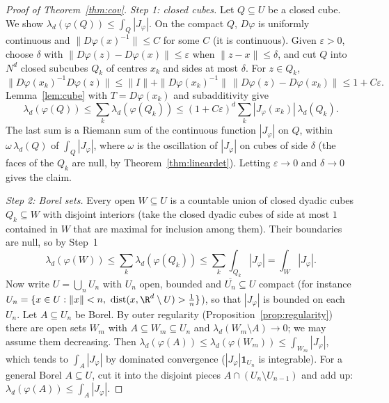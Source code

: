 \begin{proof}[Proof of Theorem~\ref{thm:cov}]
\emph{Step 1: closed cubes.} Let $Q\subseteq U$ be a closed cube. We show $\lambda_d(\varphi(Q))\le\int_Q|J_\varphi|$. On the compact $Q$, $D\varphi$ is uniformly continuous and $\|D\varphi(x)^{-1}\|\le C$ for some $C$
(it is continuous). Given $\varepsilon>0$, choose $\delta$ with $\|D\varphi(z)-D\varphi(x)\|\le\varepsilon$ when $\|z-x\|\le\delta$, and cut $Q$ into $N^d$ closed subcubes $Q_k$ of centres $x_k$ and sides
at most $\delta$. For $z\in Q_k$,
\[\|D\varphi(x_k)^{-1}D\varphi(z)\|\le\|I\|+\|D\varphi(x_k)^{-1}\|\,\|D\varphi(z)-D\varphi(x_k)\|\le1+C\varepsilon.\]
Lemma~\ref{lem:cube} with $T=D\varphi(x_k)$ and subadditivity give
\[\lambda_d(\varphi(Q))\le\sum_k\lambda_d(\varphi(Q_k))\le(1+C\varepsilon)^d\sum_k|J_\varphi(x_k)|\,\lambda_d(Q_k).\]
The last sum is a Riemann sum of the continuous function $|J_\varphi|$ on $Q$, within $\omega\,\lambda_d(Q)$ of $\int_Q|J_\varphi|$, where $\omega$ is the oscillation of $|J_\varphi|$ on cubes of side $\delta$ (the faces of the
$Q_k$ are null, by Theorem~\ref{thm:lineardet}). Letting $\varepsilon\to0$ and $\delta\to0$ gives the claim.

\emph{Step 2: Borel sets.} Every open $W\subseteq U$ is a countable union of closed dyadic cubes $Q_k\subseteq W$ with disjoint interiors (take the closed dyadic cubes of side at most $1$ contained in $W$ that are maximal for inclusion among them). Their
boundaries are null, so by Step~1
\[\lambda_d(\varphi(W))\le\sum_k\lambda_d(\varphi(Q_k))\le\sum_k\int_{Q_k}|J_\varphi|=\int_W|J_\varphi|.\]
Now write $U=\bigcup_nU_n$ with $U_n$ open, bounded and $\overline{U_n}\subseteq U$ compact (for instance $U_n=\{x\in U:\|x\|<n,\ \mathrm{dist}(x,\R^d\setminus U)>\frac1n\}$), so that $|J_\varphi|$ is bounded on each
$U_n$. Let $A\subseteq U_n$ be Borel. By outer regularity (Proposition~\ref{prop:regularity}) there are open sets $W_m$ with $A\subseteq W_m\subseteq U_n$ and $\lambda_d(W_m\setminus A)\to0$; we may assume them decreasing. Then
$\lambda_d(\varphi(A))\le\lambda_d(\varphi(W_m))\le\int_{W_m}|J_\varphi|$, which tends to $\int_A|J_\varphi|$ by dominated convergence ($|J_\varphi|\mathbf 1_{U_n}$ is integrable). For a general Borel $A\subseteq U$, cut it into the
disjoint pieces $A\cap(U_n\setminus U_{n-1})$ and add up: $\lambda_d(\varphi(A))\le\int_A|J_\varphi|$.


\end{proof}
